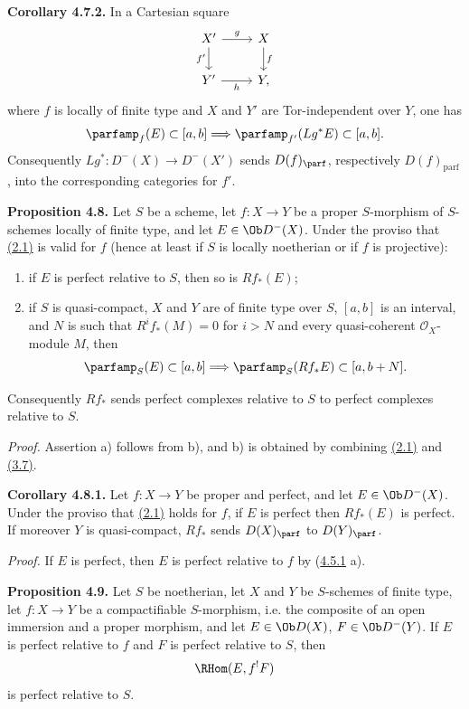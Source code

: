 \textbf{Corollary 4.7.2.} In a Cartesian square
\[
\begin{tikzcd}
X' \arrow[r,"g"] \arrow[d,"f'"'] & X \arrow[d,"f"]\\
Y' \arrow[r,"h"'] & Y,
\end{tikzcd}
\]
where \(f\) is locally of finite type and \(X\) and \(Y'\) are Tor-independent over \(Y\), one has
\[
 \parfamp_f(E)
 \subset[a,b]
 \Longrightarrow
 \parfamp_{f'}(Lg^*E)
 \subset[a,b].
\]
Consequently \(Lg^*:D^{-}(X)\to D^{-}(X')\) sends \(D(f)_{\parf}\), respectively \(D(f)_{\mathrm{parf}}\), into the corresponding categories for \(f'\).

\textbf{Proposition 4.8.} Let \(S\) be a scheme, let \(f:X\to Y\) be a proper \(S\)-morphism of \(S\)-schemes locally of finite type, and let \(E\in\Ob D^{-}(X)\). Under the proviso that \hyperlink{sga6.e03.conj.2-1}{(2.1)} is valid for \(f\) (hence at least if \(S\) is locally noetherian or if \(f\) is projective):
\begin{enumerate}[label=\alph*)]
\item if \(E\) is perfect relative to \(S\), then so is \(Rf_*(E)\);
\item if \(S\) is quasi-compact, \(X\) and \(Y\) are of finite type over \(S\), \([a,b]\) is an interval, and \(N\) is such that \(R^if_*(M)=0\) for \(i>N\) and every quasi-coherent \(\mathcal O_X\)-module \(M\), then
\[
 \parfamp_S(E)\subset[a,b]
 \Longrightarrow
 \parfamp_S(Rf_*E)
 \subset[a,b+N].
\]
\end{enumerate}
Consequently \(Rf_*\) sends perfect complexes relative to \(S\) to perfect complexes relative to \(S\).

\emph{Proof.} Assertion a) follows from b), and b) is obtained by combining \hyperlink{sga6.e03.conj.2-1}{(2.1)} and \hyperlink{sga6.e03.prop.3-7}{(3.7)}.

\textbf{Corollary 4.8.1.} Let \(f:X\to Y\) be proper and perfect, and let \(E\in\Ob D^{-}(X)\). Under the proviso that \hyperlink{sga6.e03.conj.2-1}{(2.1)} holds for \(f\), if \(E\) is perfect then \(Rf_*(E)\) is perfect. If moreover \(Y\) is quasi-compact, \(Rf_*\) sends \(D(X)_{\parf}\) to \(D(Y)_{\parf}\).

\emph{Proof.} If \(E\) is perfect, then \(E\) is perfect relative to \(f\) by (\hyperlink{sga6.e03.cor.4-5-1}{4.5.1} a).

\textbf{Proposition 4.9.} Let \(S\) be noetherian, let \(X\) and \(Y\) be \(S\)-schemes of finite type, let \(f:X\to Y\) be a compactifiable \(S\)-morphism, i.e. the composite of an open immersion and a proper morphism, and let \(E\in\Ob D(X)\), \(F\in\Ob D^{-}(Y)\). If \(E\) is perfect relative to \(f\) and \(F\) is perfect relative to \(S\), then
\[
 \RHom(E,f^!F)
\]
is perfect relative to \(S\).

